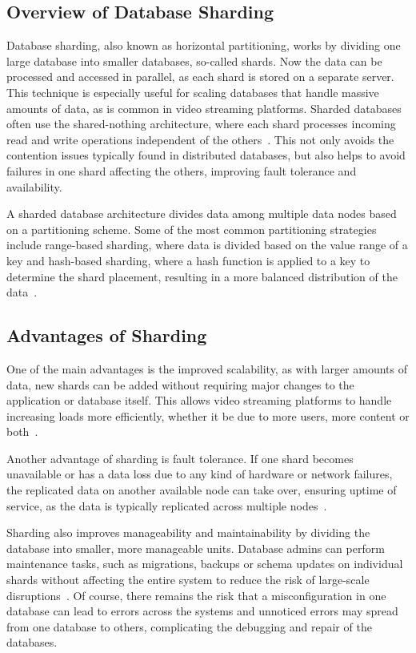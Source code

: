 \subsection{Overview of Database Sharding}
Database sharding, also known as horizontal partitioning, works by dividing one large database into smaller databases, so-called shards. Now the data can be processed and accessed in parallel, as each shard is stored on a separate server. This technique is especially useful for scaling databases that handle massive amounts of data, as is common in video streaming platforms. 
Sharded databases often use the shared-nothing architecture, where each shard processes incoming read and write operations independent of the others~\parencite{db_sharding}. This not only avoids the contention issues typically found in distributed databases, but also helps to avoid failures in one shard affecting the others, improving fault tolerance and availability.

A sharded database architecture divides data among multiple data nodes based on a partitioning scheme. Some of the most common partitioning strategies include range-based sharding, where data is divided based on the value range of a key and hash-based sharding, where a hash function is applied to a key to determine the shard placement, resulting in a more balanced distribution of the data~\parencite{db_sharding}.

\subsection{Advantages of Sharding}
One of the main advantages is the improved scalability, as with larger amounts of data, new shards can be added without requiring major changes to the application or database itself. This allows video streaming platforms to handle increasing loads more efficiently, whether it be due to more users, more content or both~\parencite{db_sharding}.

Another advantage of sharding is fault tolerance. If one shard becomes unavailable or has a data loss due to any kind of hardware or network failures, the replicated data on another available node can take over, ensuring uptime of service, as the data is typically replicated across multiple nodes~\parencite{db_sharding}.

\noindent Sharding also improves manageability and maintainability by dividing the database into smaller, more manageable units. Database admins can perform maintenance tasks, such as migrations, backups or schema updates on individual shards without affecting the entire system to reduce the risk of large-scale disruptions~\parencite{db_sharding}. Of course, there remains the risk that a misconfiguration in one database can lead to errors across the systems and unnoticed errors may spread from one database to others, complicating the debugging and repair of the databases.

